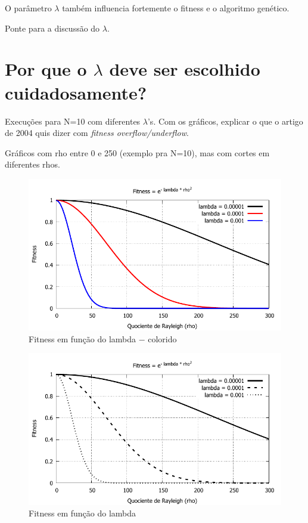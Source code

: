 		
		O parâmetro $\lambda$ também influencia fortemente o fitness e o algoritmo genético.
		
		Ponte para a discussão do $\lambda$.
		
	\section{Por que o $\lambda$ deve ser escolhido cuidadosamente?}
	
	Execuções para N=10 com diferentes $\lambda$'s. Com os gráficos, explicar o que o artigo de 2004 quis dizer com \textit{fitness overflow/underflow}.
	
	Gráficos com rho entre 0 e 250 (exemplo pra N=10), mas com cortes em diferentes rhos.
	
	\begin{figure}[pt]
	\centering
		\includegraphics{figs/varios-fits-color.pdf}
	\caption{Fitness em função do lambda $-$ colorido}
	\label{fig:varios-fits-color}
\end{figure}

\begin{figure}[pb]
	\centering
		\includegraphics{figs/varios-fits-mono.pdf}
	\caption{Fitness em função do lambda}
	\label{fig:varios-fits-mono}
\end{figure}

